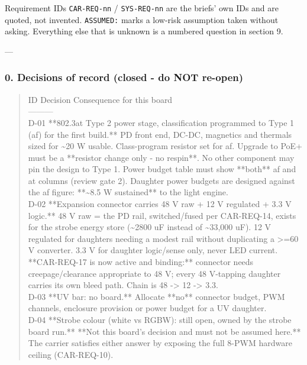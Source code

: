 \documentclass[11pt,a4paper]{article}
\begin{document}
Requirement IDs \texttt{CAR-REQ-nn} / \texttt{SYS-REQ-nn} are the briefs' own IDs and are quoted, not invented. \texttt{ASSUMED:} marks a low-risk assumption taken without asking. Everything else that is unknown is a numbered question in section 9.

---

\subsubsection*{0. Decisions of record (closed - do NOT re-open)}
\begin{quote}\small\ttfamily\raggedright
\textbar{} ID \textbar{} Decision \textbar{} Consequence for this board \textbar{}\\
\textbar{}---\textbar{}---\textbar{}---\textbar{}\\
\textbar{} D-01 \textbar{} {*}{*}802.3at Type 2 power stage, classification programmed to Type 1 (af) for the first build.{*}{*} \textbar{} PD front end, DC-DC, magnetics and thermals sized for \textasciitilde{}20 W usable. Class-program resistor set for af. Upgrade to PoE+ must be a {*}{*}resistor change only - no respin{*}{*}. No other component may pin the design to Type 1. Power budget table must show {*}{*}both{*}{*} af and at columns (review gate 2). Daughter power budgets are designed against the af figure: {*}{*}\textasciitilde{}8.5 W sustained{*}{*} to the light engine. \textbar{}\\
\textbar{} D-02 \textbar{} {*}{*}Expansion connector carries 48 V raw + 12 V regulated + 3.3 V logic.{*}{*} \textbar{} 48 V raw = the PD rail, switched/fused per CAR-REQ-14, exists for the strobe energy store (\textasciitilde{}2800 uF instead of \textasciitilde{}33,000 uF). 12 V regulated for daughters needing a modest rail without duplicating a \textgreater{}=60 V converter. 3.3 V for daughter logic/sense only, never LED current. {*}{*}CAR-REQ-17 is now active and binding:{*}{*} connector needs creepage/clearance appropriate to 48 V; every 48 V-tapping daughter carries its own bleed path. Chain is 48 -\textgreater{} 12 -\textgreater{} 3.3. \textbar{}\\
\textbar{} D-03 \textbar{} {*}{*}UV bar: no board.{*}{*} \textbar{} Allocate {*}{*}no{*}{*} connector budget, PWM channels, enclosure provision or power budget for a UV daughter. \textbar{}\\
\textbar{} D-04 \textbar{} {*}{*}Strobe colour (white vs RGBW): still open, owned by the strobe board run.{*}{*} \textbar{} {*}{*}Not this board's decision and must not be assumed here.{*}{*} The carrier satisfies either answer by exposing the full 8-PWM hardware ceiling (CAR-REQ-10). \textbar{}\\

\end{quote}
\end{document}
